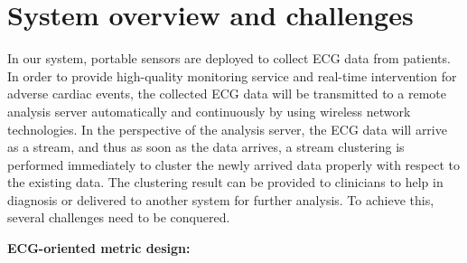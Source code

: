 \documentclass[conference]{IEEEtran}
\begin{document}
%



\section{System overview and challenges}
In our system, portable sensors are deployed to collect ECG data from patients. In order to provide high-quality monitoring service and real-time intervention for adverse cardiac events, the collected ECG data will be transmitted to a remote analysis server automatically and continuously by using wireless network technologies. In the perspective of the analysis server, the ECG data will arrive as a stream, and thus as soon as the data arrives, a stream clustering is performed immediately to cluster the newly arrived data properly with respect to the existing data. The clustering result can be provided to clinicians to help in diagnosis or delivered to another system for further analysis. To achieve this, several challenges need to be conquered.


\textbf{ECG-oriented metric design:}
\end{document}

